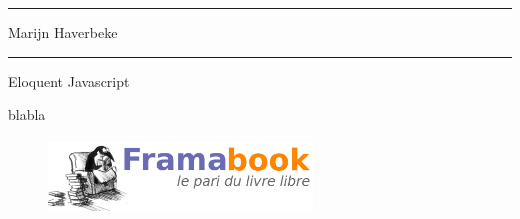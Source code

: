 \documentclass{FramateX}
\begin{document}
\sloppy %
\renewcommand{\figurename}{F\textsc{igure} }
\renewcommand{\tablename}{T\textsc{able} }

\def\appendixpage{\vspace*{8cm}
\begin{center}
\Huge\textbf{Annexes}
\end{center}
}
\def\appendixname{Annexe}



\frontmatter                        

            
\begin{titlepage}
\noindent\rule{\linewidth}{1pt}
\begin{center}\LARGE{Marijn Haverbeke}\end{center}
\noindent\rule{\linewidth}{1pt}
\begin{center}\Huge{Eloquent Javascript}\end{center}
\begin{center}\LARGE{blabla}\end{center}
\begin{center}

\begin{figure}[!ht]
\begin{center}  \includegraphics[width=70mm,height=20mm]{img/Logo_framabook_grand.png}  \end{center}
\end{figure}


\end{center}
\end{titlepage}
\end{document}
